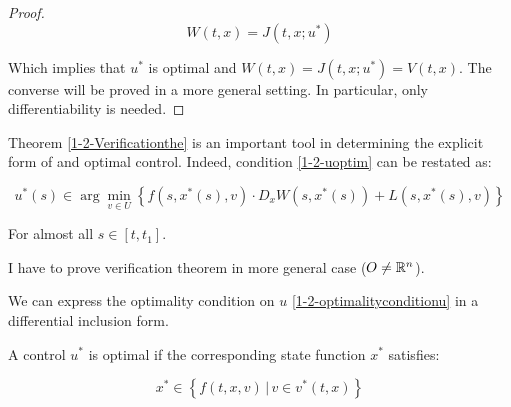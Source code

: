 \begin{theorem}
\begin{proof}
        \[W(t,x) = J(t,x;u^{\ast})\]

        Which implies that $u^{\ast}$ is optimal and $W(t,x)=J(t,x;u^{\ast})=V(t,x)$. 
        The converse will be proved in a more general setting. In particular, only differentiability is needed.

    \end{proof} 
\end{theorem}


Theorem \ref*{1-2-Verificationthe} is an important tool in determining the explicit form of and optimal control. 
Indeed, condition \ref*{1-2-uoptim} can be restated as:

\begin{equation}\label{1-2-optimalityconditionu}
        u^{\ast}(s) \in \arg\min_{v\in U} \left\{ f(s,x^{\ast}(s),v) \cdot D_xW(s,x^{\ast}(s)) + L(s,x^{\ast}(s),v)\right\}
\end{equation}

For almost all $s\in[t,t_1]$.

I have to prove verification theorem in more general case ($O\neq\mathbb{R}^n$).

We can express the optimality condition on $u$ \ref*{1-2-optimalityconditionu} in a differential inclusion form. 

\begin{corollary}
    A control $u^{\ast}$ is optimal if the corresponding state function $x^{\ast}$ satisfies:

    \begin{equation}
        x^{\ast} \in \left\{f(t,x,v) \,|\, v\in v^{\ast}(t,x)\right\}
    \end{equation}
\end{corollary}